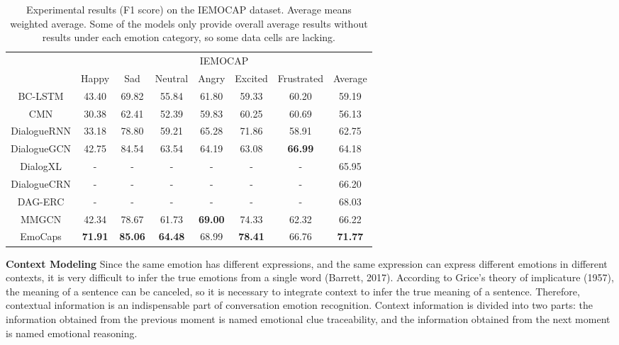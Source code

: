 \documentclass[11pt]{article}
\begin{document}
\begin{table*}[]
	\centering
	\begin{tabular}{c|c|c|c|c|c|c|c}
		\hline
		& \multicolumn{7}{c}{IEMOCAP}                                                                                         \\ \cline{2-8} 
		& Happy          & Sad            & Neutral        & Angry          & Excited        & Frustrated     & Average        \\ \hline
		BC-LSTM        & 43.40          & 69.82          & 55.84          & 61.80          & 59.33          & 60.20          & 59.19          \\
		CMN            & 30.38          & 62.41          & 52.39          & 59.83          & 60.25          & 60.69          & 56.13          \\
		DialogueRNN    & 33.18          & 78.80          & 59.21          & 65.28          & 71.86          & 58.91          & 62.75          \\
		DialogueGCN    & 42.75          & 84.54          & 63.54          & 64.19          & 63.08          & \textbf{66.99} & 64.18          \\
		DialogXL       & -              & -              & -              & -              & -              & -              & 65.95          \\
		DialogueCRN       & -              & -              & -              & -              & -              & -              & 66.20          \\
		DAG-ERC       & -              & -              & -              & -              & -              & -              & 68.03          \\
		MMGCN          & 42.34          & 78.67          & 61.73          & \textbf{69.00} & 74.33          & 62.32          & 66.22          \\ \hline
		EmoCaps & \textbf{71.91} & \textbf{85.06} & \textbf{64.48} & 68.99          & \textbf{78.41} & 66.76          & \textbf{71.77} \\ \hline
	\end{tabular}
	\caption{Experimental results (F1 score) on the IEMOCAP dataset. Average means weighted average. Some of the models only provide overall average results without results under each emotion category, so some data cells are lacking. }
\end{table*}
\noindent\textbf{Context Modeling} Since the same emotion has different expressions, and the same expression can express different emotions in different contexts, it is very difficult to infer the true emotions from a single word (Barrett, 2017). According to Grice's theory of implicature (1957), the meaning of a sentence can be canceled, so it is necessary to integrate context to infer the true meaning of a sentence. Therefore, contextual information is an indispensable part of conversation emotion recognition. Context information is divided into two parts: the information obtained from the previous moment is named emotional clue traceability, and the information obtained from the next moment is named emotional reasoning.
\end{document}

